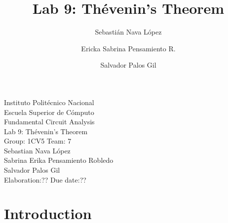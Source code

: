 \documentclass[letterpaper]{article}
\title{Lab 9: Thévenin's Theorem}
\author{
    Sebastián Nava López\\
    \and
    Ericka Sabrina Pensamiento R.\\
    \and
    Salvador Palos Gil
}
\begin{document}
\begin{titlepage}
    \centering
    {\Huge Instituto Politécnico Nacional}\\[3ex]
    {\huge Escuela Superior de Cómputo}\\[8ex]
    {\huge Fundamental Circuit Analysis}\\[12ex]
    {\Large Lab 9: Thévenin's Theorem}\\[20ex]
    {\Large Group: 1CV5 Team: 7 \\[8ex]
    Sebastian Nava López\\[4ex]
    Sabrina Erika Pensamiento Robledo\\[4ex]
    Salvador Palos Gil\\[18ex]
    }
    \large{Elaboration:?? \hspace{8em} Due date:??}
\end{titlepage}
\tableofcontents
\newpage
\section{Introduction}
\newpage
\end{document}
